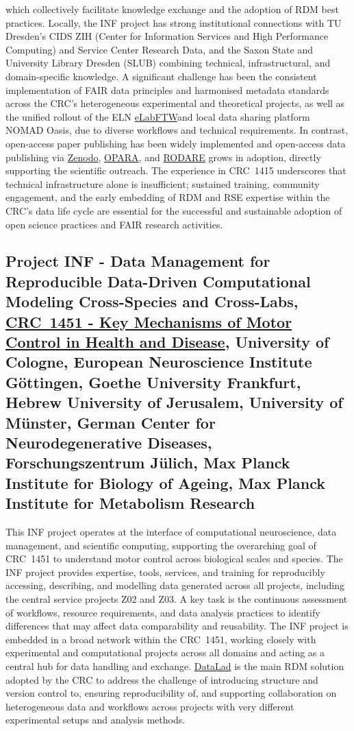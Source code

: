 \documentclass{eceasst}
\newcommand{\elabftw}{\href{https://www.elabftw.net/}{eLabFTW}}
\begin{document}
which collectively facilitate knowledge exchange and the adoption of RDM best practices.
Locally, the INF project has strong institutional connections with TU Dresden’s CIDS ZIH (Center for Information Services and High Performance Computing)
and Service Center Research Data, and the Saxon State and University Library Dresden (SLUB)
combining technical, infrastructural, and domain-specific knowledge.
A significant challenge has been the consistent implementation of FAIR data principles and harmonised metadata standards across the CRC’s heterogeneous experimental and theoretical projects,
as well as the unified rollout of the ELN \elabftw and local data sharing platform NOMAD Oasis, due to diverse workflows and technical requirements.
In contrast, open-access paper publishing has been widely implemented and open-access data publishing via \href{https://zenodo.org/communities/crc1415/about}{Zenodo}, \href{https://opara.zih.tu-dresden.de/home}{OPARA}, and \href{https://rodare.hzdr.de/communities/crc1415}{RODARE} grows in adoption,
directly supporting the scientific outreach.
The experience in CRC~1415 underscores that technical infrastructure alone is insufficient; sustained training, community engagement, and the early embedding of RDM and RSE expertise within the CRC’s data life cycle are essential for the successful and sustainable adoption of open science practices and FAIR research activities.

\subsection{Project INF - Data Management for Reproducible Data-Driven Computational Modeling Cross-Species and Cross-Labs, \href{https://gepris.dfg.de/gepris/projekt/458705875?language=en}{CRC~1451 - Key Mechanisms of Motor Control in Health and Disease}, University of Cologne, European Neuroscience Institute Göttingen, Goethe University Frankfurt, Hebrew University of Jerusalem, University of Münster, German Center for Neurodegenerative Diseases, Forschungszentrum Jülich, Max Planck Institute for Biology of Ageing, Max Planck Institute for Metabolism Research}
This INF project operates at the interface of computational neuroscience, data management, and scientific computing, supporting the overarching goal of CRC~1451 to understand motor control across biological scales and species.
The INF project provides expertise, tools, services, and training for reproducibly accessing, describing, and modelling data generated across all projects, including the central service projects Z02 and Z03.
A key task is the continuous assessment of workflows, resource requirements, and data analysis practices to identify differences that may affect data comparability and reusability.
The INF project is embedded in a broad network within the CRC~1451, working closely with experimental and computational projects across all domains and acting as a central hub for data handling and exchange.
\href{https://www.datalad.org/)}{DataLad} is the main RDM solution adopted by the CRC to address the challenge of introducing structure and version control to, ensuring reproducibility of, and supporting collaboration on heterogeneous data and workflows across projects with very different experimental setups and analysis methods.
\end{document}
